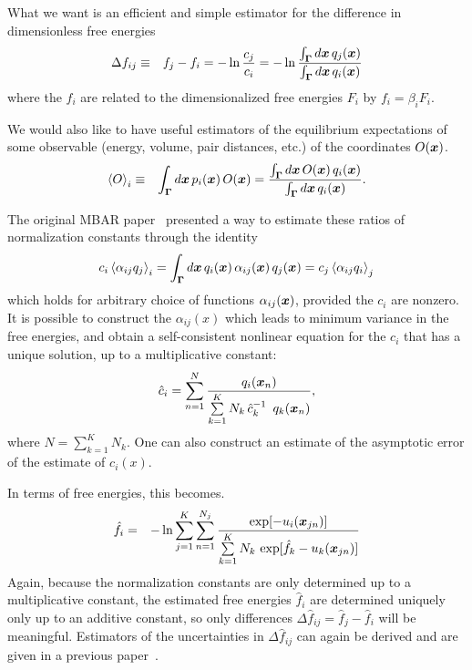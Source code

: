 \documentclass[aps,pre,twocolumn,superscriptaddress]{revtex4-1}
\newcommand{\bfv}[1]{{\mbox{\boldmath{$#1$}}}}
\newcommand{\bfm}[1]{{\bf #1}}
\newcommand{\expect}[1]{\left \langle #1 \right \rangle} %
\newcommand{\x}{\bfv{x}}
\begin{document}
What we want is an efficient and simple estimator for the difference
in dimensionless free energies
\begin{eqnarray}
\Delta f_{ij} &\equiv& f_j - f_i = - \ln \frac{c_j}{c_i} = - \ln \frac{\int_\bfm{\Gamma} d\x \, q_j(\x)}{\int_\bfm{\Gamma} d\x \, q_i(\x)} \label{equation:dimensionless-free-energy}
\end{eqnarray}
where the $f_i$ are related to the dimensionalized free energies $F_i$ by $f_i = \beta_i F_i$.  

We would also like to have useful estimators of the equilibrium
expectations of some observable (energy, volume, pair distances, etc.)
of the coordinates $O(\x)$.
\begin{eqnarray}
\expect{O}_i &\equiv& \int_{\bfm{\Gamma}} d\x \, p_i(\x) \, O(\x) = \frac{\int_\bfm{\Gamma} d\x \, O(\x) \, q_i(\x)}{\int_\bfm{\Gamma} d\x \, q_i(\x)} .\label{equation:equilibrium-expectation}
\end{eqnarray}

The original MBAR paper~\cite{shirts-chodera:jcp:2008:mbar} presented
a way to estimate these ratios of normalization constants through the
identity
\begin{eqnarray}
c_i \expect{\alpha_{ij} q_j}_i = \int_{\bfm{\Gamma}} d\x \, q_i(\x) \, \alpha_{ij}(\x) \, q_j(\x)  =  c_j \expect{\alpha_{ij} q_i}_j
\label{equation:Bennett_starting}
\end{eqnarray}
which holds for arbitrary choice of functions $\alpha_{ij}(\x)$,
provided the $c_i$ are nonzero.  It is possible to construct the
$\alpha_{ij}(x)$ which leads to minimum variance in the free energies,
and obtain a self-consistent nonlinear equation for the $c_i$ that has
a unique solution, up to a multiplicative constant:
\begin{eqnarray}
\hat{c}_i = \sum_{n=1}^N \frac{ q_i(\x_n)}{\sum\limits_{k=1}^K N_k \, \hat{c}_k^{-1} \,\ q_k(\x_n)},
\end{eqnarray}
where $N = \sum_{k=1}^K N_k$. One can also construct an estimate of the
asymptotic error of the estimate of $c_i(x)$.~\citep{shirts-chodera:jcp:2008:mbar}

In terms of free energies, this becomes.
\begin{eqnarray}
\hat f_i &=& - \ln \sum_{j=1}^K \sum_{n=1}^{N_j} \frac{\exp[-u_i(\x_{jn})]}{\sum\limits_{k=1}^K N_k \, \exp[\hat{f}_k - u_k(\x_{jn})]} \label{equation:estimator-of-free-energies}
\end{eqnarray}
Again, because the normalization constants are only determined up to a
multiplicative constant, the estimated free energies $\hat{f}_i$ are
determined uniquely only up to an additive constant, so only
differences $\Delta \hat{f}_{ij} = \hat{f}_j - \hat{f}_i$ will be
meaningful.  Estimators of the uncertainties in $\Delta \hat{f}_{ij}$
can again be derived and are given in a previous
paper~\cite{shirts-chodera:jcp:2008:mbar}. 
\end{document}

